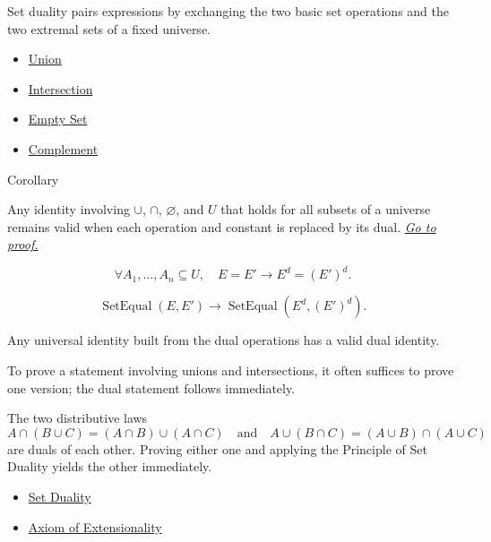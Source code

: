 \begin{remark*}[Interpretation]
Set duality pairs expressions by exchanging the two basic set operations and
the two extremal sets of a fixed universe.
\end{remark*}

\begin{dependencies}
\begin{itemize}
  \item \hyperref[def:union]{Union}
  \item \hyperref[def:intersection]{Intersection}
  \item \hyperref[def:empty-set]{Empty Set}
  \item \hyperref[def:complement]{Complement}
\end{itemize}
\end{dependencies}

\begin{corollarybox}{Corollary}
\begin{corollary}\label{cor:set-duality}
Any identity involving $\cup$, $\cap$, $\varnothing$, and $U$ that holds for
all subsets of a universe remains valid when each operation and constant is
replaced by its dual.
\hyperref[prf:set-duality]{\textit{Go to proof.}}
\end{corollary}
\end{corollarybox}

\begin{remark*}
\[
  \forall A_1,\dots,A_n\subseteq U,\quad
  E=E'
  \to
  E^d=(E')^d.
\]
\end{remark*}

\begin{remark*}
\[
  \operatorname{SetEqual}(E,E')
  \to
  \operatorname{SetEqual}(E^d,(E')^d).
\]
\end{remark*}

\begin{remark*}[Interpretation]
Any universal identity built from the dual operations has a valid dual identity.
\end{remark*}

\begin{remark*}[Exposition]
To prove a statement involving unions and intersections, it often suffices to
prove one version; the dual statement follows immediately.
\end{remark*}

\begin{remark*}[Exposition]
The two distributive laws
\[
A \cap (B \cup C) = (A \cap B) \cup (A \cap C)
\quad\text{and}\quad
A \cup (B \cap C) = (A \cup B) \cap (A \cup C)
\]
are duals of each other. Proving either one and applying the Principle of Set
Duality yields the other immediately.
\end{remark*}

\begin{dependencies}
\begin{itemize}
  \item \hyperref[def:set-duality]{Set Duality}
  \item \hyperref[ax:extensionality]{Axiom of Extensionality}
\end{itemize}
\end{dependencies}
